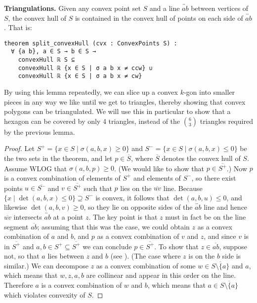 \textbf{Triangulations.} Given any convex point set $S$
and a line $\overleftrightarrow{ab}$ between vertices of $S$,
the convex hull of $S$ is contained in the convex hull
of points on each side of $\overleftrightarrow{ab}$. That is:
\begin{lstlisting}
theorem split_convexHull (cvx : ConvexPoints S) :
  ∀ {a b}, a ∈ S → b ∈ S →
    convexHull ℝ S ⊆
    convexHull ℝ {x ∈ S | σ a b x ≠ ccw} ∪
    convexHull ℝ {x ∈ S | σ a b x ≠ cw}
\end{lstlisting}
By using this lemma repeatedly, we can slice up a convex $k$-gon into smaller pieces in any way we like until we get to triangles, thereby showing that convex polygons can be triangulated. We will use this in particular to show that a hexagon can be covered by only 4 triangles, instead of the ${6\choose 3}$ triangles required by the previous lemma.

\begin{proof}
    Let $S^+=\{x\in S\mid \sigma(a,b,x)\ge 0\}$ and $S^-=\{x\in S\mid \sigma(a,b,x)\le 0\}$ be the two sets in the theorem, and let $p\in \overline{S}$, where $\overline{S}$ denotes the convex hull of $S$. Assume WLOG that $\sigma(a,b,p)\ge 0$. (We would like to show that $p\in \overline{S^+}$.) Now $p$ is a convex combination of elements of $S^+$ and elements of $S^-$, so there exist points $u\in \overline{S^-}$ and $v\in \overline{S^+}$ such that $p$ lies on the $\overline{uv}$ line.
% 
    Because $\{x\mid \det(a,b,x)\le 0\}\supseteq S^-$ is convex, it follows that $\det(a,b,u)\le 0$, and likewise $\det(a,b,v)\ge 0$, so they lie on opposite sides of the $\overleftrightarrow{ab}$ line and hence $\overline{uv}$ intersects $\overleftrightarrow{ab}$ at a point $z$. The key point is that $z$ must in fact be on the line segment $\overline{ab}$; assuming that this was the case, we could obtain $z$ as a convex combination of $a$ and $b$, and $p$ as a convex combination of $v$ and $z$, and since $v$ is in $\overline{S^+}$ and $a,b\in S^+\subseteq\overline{S^+}$ we can conclude $p\in \overline{S^+}$.
% 
    To show that $z\in \overline{ab}$, suppose not, so that $a$ lies between $z$ and $b$ (see ). (The case where $z$ is on the $b$ side is similar.) We can decompose $z$ as a convex combination of some $w\in \overline{S\setminus\{a\}}$ and $a$, which means that $w,z,a,b$ are collinear and appear in this order on the line. Therefore $a$ is a convex combination of $w$ and $b$, which means that $a\in \overline{S\setminus\{a\}}$ which violates convexity of $S$.
\end{proof}

